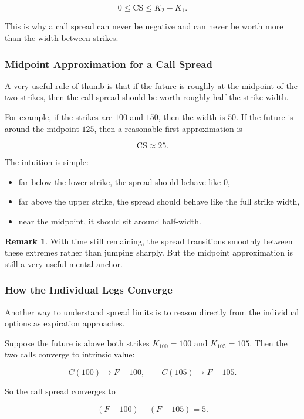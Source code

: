 \documentclass[11pt]{article}
\theoremstyle{definition}
\newtheorem{remark}{Remark}[section]
\begin{document}
\[
0 \le \text{CS} \le K_2-K_1.
\]

This is why a call spread can never be negative and can never be worth more than the width between strikes.

\subsubsection{Midpoint Approximation for a Call Spread}

A very useful rule of thumb is that if the future is roughly at the midpoint of the two strikes, then the call spread should be worth roughly half the strike width.

For example, if the strikes are \(100\) and \(150\), then the width is \(50\). If the future is around the midpoint \(125\), then a reasonable first approximation is

\[
\text{CS} \approx 25.
\]

The intuition is simple:
\begin{itemize}[leftmargin=2em]
    \item far below the lower strike, the spread should behave like \(0\),
    \item far above the upper strike, the spread should behave like the full strike width,
    \item near the midpoint, it should sit around half-width.
\end{itemize}

\begin{remark}
With time still remaining, the spread transitions smoothly between these extremes rather than jumping sharply. But the midpoint approximation is still a very useful mental anchor.
\end{remark}

\subsubsection{How the Individual Legs Converge}

Another way to understand spread limits is to reason directly from the individual options as expiration approaches.

Suppose the future is above both strikes \(K_{100}=100\) and \(K_{105}=105\). Then the two calls converge to intrinsic value:

\[
C(100) \to F-100,
\qquad
C(105) \to F-105.
\]

So the call spread converges to

\[
(F-100) - (F-105) = 5.
\]
\end{document}
